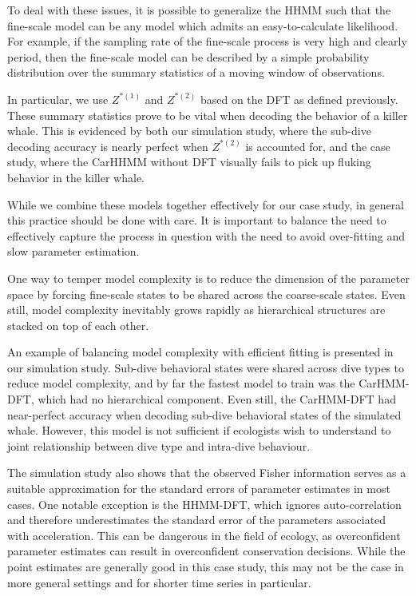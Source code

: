 To deal with these issues, it is possible to generalize the HHMM such that the fine-scale model can be any model which admits an easy-to-calculate likelihood. For example, if the sampling rate of the fine-scale process is very high and clearly period, then the fine-scale model can be described by a simple probability distribution over the summary statistics of a moving window of observations. 

In particular, we use $Z^{*(1)}$ and $Z^{*(2)}$ based on the DFT as defined previously. These summary statistics prove to be vital when decoding the behavior of a killer whale. This is evidenced by both our simulation study, where the sub-dive decoding accuracy is nearly perfect when $Z^{*(2)}$ is accounted for, and the case study, where the CarHHMM without DFT visually fails to pick up fluking behavior in the killer whale.

While we combine these models together effectively for our case study, in general this practice should be done with care. It is important to balance the need to effectively capture the process in question with the need to avoid over-fitting and slow parameter estimation.

One way to temper model complexity is to reduce the dimension of the parameter space by forcing fine-scale states to be shared across the coarse-scale states. Even still, model complexity inevitably grows rapidly as hierarchical structures are stacked on top of each other.

An example of balancing model complexity with efficient fitting is presented in our simulation study. Sub-dive behavioral states were shared across dive types to reduce model complexity, and by far the fastest model to train was the CarHMM-DFT, which had no hierarchical component. Even still, the CarHMM-DFT had near-perfect accuracy when decoding sub-dive behavioral states of the simulated whale.
However, this model is not sufficient if ecologists wish to understand to joint relationship between dive type and intra-dive behaviour. 

The simulation study also shows that the observed Fisher information serves as a suitable approximation for the standard errors of parameter estimates in most cases. One notable exception is the HHMM-DFT, which ignores auto-correlation and therefore underestimates the standard error of the parameters associated with acceleration. This can be dangerous in the field of ecology, as overconfident parameter estimates can result in overconfident conservation decisions. While the point estimates are generally good in this case study, this may not be the case in more general settings and for shorter time series in particular.

